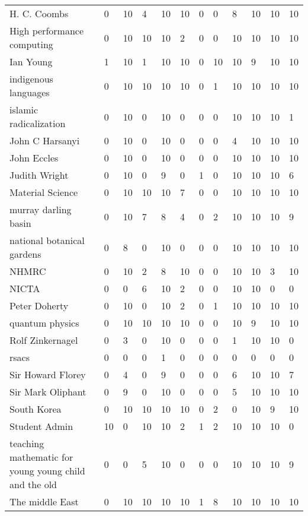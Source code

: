\begin{table}
\begin{tabular*}{0.5\textwidth}{|p{5cm}|l|l|l|l|l|l|l|l|l|l|l|}
\cline{1-12}
H. C. Coombs &0 &10 &4 &10 &10 &0 &0 &8 &10 &10 &10\\
\cline{1-12}
High performance computing &0 &10 &10 &10 &2 &0 &0 &10 &10 &10 &10\\
\cline{1-12}
Ian Young &1 &10 &1 &10 &10 &0 &10 &10 &9 &10 &10\\
\cline{1-12}
indigenous languages &0 &10 &10 &10 &10 &0 &1 &10 &10 &10 &10\\
\cline{1-12}
islamic radicalization &0 &10 &0 &10 &0 &0 &0 &10 &10 &10 &1\\
\cline{1-12}
John C Harsanyi &0 &10 &0 &10 &0 &0 &0 &4 &10 &10 &10\\
\cline{1-12}
John Eccles &0 &10 &0 &10 &0 &0 &0 &10 &10 &10 &10\\
\cline{1-12}
Judith Wright &0 &10 &0 &9 &0 &1 &0 &10 &10 &10 &6\\
\cline{1-12}
Material Science &0 &10 &10 &10 &7 &0 &0 &10 &10 &10 &10\\
\cline{1-12}
murray darling basin &0 &10 &7 &8 &4 &0 &2 &10 &10 &10 &9\\
\cline{1-12}
national botanical gardens &0 &8 &0 &10 &0 &0 &0 &10 &10 &10 &10\\
\cline{1-12}
NHMRC &0 &10 &2 &8 &10 &0 &0 &10 &10 &3 &10\\
\cline{1-12}
NICTA &0 &0 &6 &10 &2 &0 &0 &10 &10 &0 &0\\
\cline{1-12}
Peter Doherty &0 &10 &0 &10 &2 &0 &1 &10 &10 &10 &10\\
\cline{1-12}
quantum physics &0 &10 &10 &10 &10 &0 &0 &10 &9 &10 &10\\
\cline{1-12}
Rolf Zinkernagel &0 &3 &0 &10 &0 &0 &0 &1 &10 &10 &0\\
\cline{1-12}
rsacs &0 &0 &0 &1 &0 &0 &0 &0 &0 &0 &0\\
\cline{1-12}
Sir Howard Florey &0 &4 &0 &9 &0 &0 &0 &6 &10 &10 &7\\
\cline{1-12}
Sir Mark Oliphant &0 &9 &0 &10 &0 &0 &0 &5 &10 &10 &10\\
\cline{1-12}
South Korea &0 &10 &10 &10 &10 &0 &2 &0 &10 &9 &10\\
\cline{1-12}
Student Admin &10 &0 &10 &10 &2 &1 &2 &10 &10 &10 &0\\
\cline{1-12}
teaching mathematic for young young child and the old &0 &0 &5 &10 &0 &0 &0 &10 &10 &10 &9\\
\cline{1-12}
The middle East &0 &10 &10 &10 &10 &1 &8 &10 &10 &10 &10\\
\cline{1-12}
\end{tabular*}
\end{table}